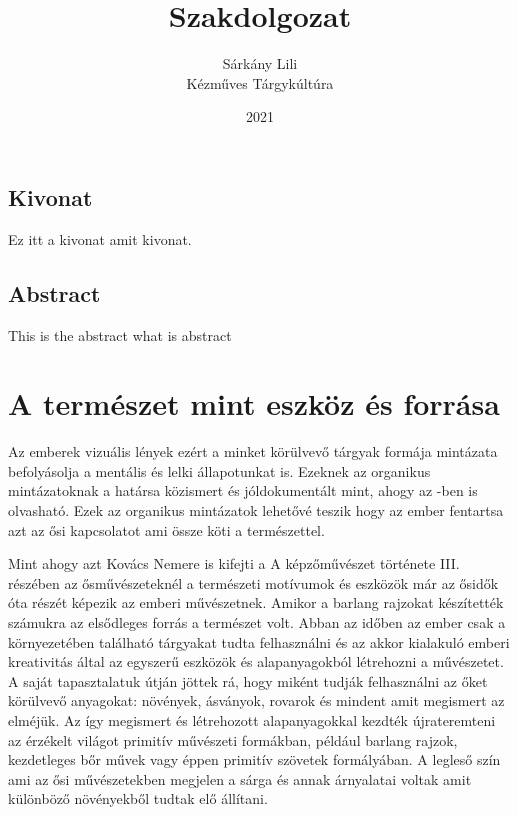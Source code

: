 \documentclass[fontsize=12pt, appendixprefix=true]{scrreprt}
\author{Sárkány Lili\\Kézműves Tárgykúltúra}
\title{Szakdolgozat}
\date{2021}
\newcommand{\pushtobottom}{\vspace*{\fill}}
\newcommand{\signatureline}[1]{\begin{flushright}
	\vspace*{.5cm}\par\noindent\makebox[2.5in]{\hrulefill}
	\par\noindent\makebox[2.5in][c]{#1}
	\end{flushright}
}
\begin{document}
\maketitle


\newpage
\section*{Kivonat}
Ez itt a kivonat amit kivonat.
\newpage
\section*{Abstract}
\begin{otherlanguage}{english}
This is the abstract what is abstract
\end{otherlanguage}

\tableofcontents

\chapter{A természet mint eszköz és forrása}

Az emberek vizuális lények ezért a minket körülvevő tárgyak formája mintázata befolyásolja a mentális és lelki állapotunkat is. Ezeknek az organikus mintázatoknak a határsa közismert és jóldokumentált mint, ahogy az \cite{biophilic} -ben is olvasható. Ezek az organikus mintázatok lehetővé teszik hogy az ember fentartsa azt az ősi kapcsolatot ami össze köti a természettel. 

Mint ahogy azt Kovács Nemere is kifejti a A képzőművészet története III. részében az ősművészeteknél \cite{nemerekepzHomHuveszet} a természeti motívumok és eszközök már az ősidők óta részét képezik az emberi művészetnek. Amikor a barlang rajzokat készítették számukra az elsődleges forrás a természet volt.
Abban az időben az ember csak a környezetében található tárgyakat tudta felhasználni és az akkor kialakuló emberi kreativitás által az egyszerű eszközök és alapanyagokból létrehozni a művészetet. A saját tapasztalatuk útján jöttek rá, hogy miként tudják felhasználni az őket körülvevő anyagokat: növények, ásványok, rovarok és mindent amit megismert az elméjük. Az így megismert és létrehozott alapanyagokkal kezdték újrateremteni az érzékelt világot primitív művészeti formákban, például barlang rajzok, kezdetleges bőr művek vagy éppen primitív szövetek formályában. A legleső szín ami az ősi művészetekben megjelen a sárga és annak árnyalatai voltak amit különböző növényekből tudtak elő állítani.
\end{document}
